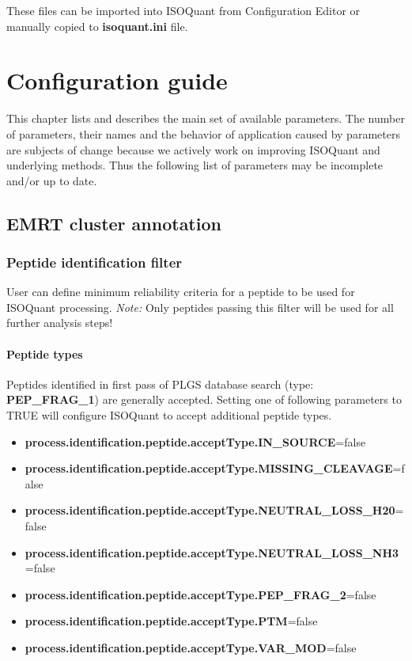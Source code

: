 \documentclass[]{article}
\providecommand{\tightlist}{%
  \setlength{\itemsep}{0pt}\setlength{\parskip}{0pt}}
\let\oldparagraph\paragraph
\renewcommand{\paragraph}[1]{\oldparagraph{#1}\mbox{}}
\begin{document}
These files can be imported into ISOQuant from Configuration Editor or
manually copied to \textbf{isoquant.ini} file.

\clearpage

\section{Configuration guide}\label{configuration-guide}

This chapter lists and describes the main set of available parameters.
The number of parameters, their names and the behavior of application
caused by parameters are subjects of change because we actively work on
improving ISOQuant and underlying methods. Thus the following list of
parameters may be incomplete and/or up to date.

\subsection{EMRT cluster annotation}\label{emrt-cluster-annotation}

\subsubsection{Peptide identification
filter}\label{peptide-identification-filter}

User can define minimum reliability criteria for a peptide to be used
for ISOQuant processing. \emph{Note:} Only peptides passing this filter
will be used for all further analysis steps!

\paragraph{Peptide types}\label{peptide-types}

Peptides identified in first pass of PLGS database search (type:
\textbf{PEP\_FRAG\_1}) are generally accepted. Setting one of following
parameters to TRUE will configure ISOQuant to accept additional peptide
types.

\begin{itemize}
\tightlist
\item
  \textbf{process.identification.peptide.acceptType.IN\_SOURCE}=false
\item
  \textbf{process.identification.peptide.acceptType.MISSING\_CLEAVAGE}=false
\item
  \textbf{process.identification.peptide.acceptType.NEUTRAL\_LOSS\_H20}=false
\item
  \textbf{process.identification.peptide.acceptType.NEUTRAL\_LOSS\_NH3}=false
\item
  \textbf{process.identification.peptide.acceptType.PEP\_FRAG\_2}=false
\item
  \textbf{process.identification.peptide.acceptType.PTM}=false
\item
  \textbf{process.identification.peptide.acceptType.VAR\_MOD}=false
\end{itemize}
\end{document}
